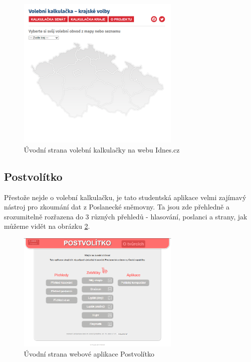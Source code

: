 \begin{figure}
    \centering
    \includegraphics[width=0.7\textwidth]{obrazky-figures/idnes-uvod.png}
    \caption{Úvodní strana volební kalkulačky na webu Idnes.cz}
    \label{fig:idnes-uvod}
\end{figure}

\subsection{Postvolítko}
Přestože nejde o volební kalkulačku, je tato studentská aplikace velmi zajímavý nástroj pro zkoumání dat z Poslanecké sněmovny. Ta jsou zde přehledně a srozumitelně rozřazena do 3 různých přehledů - hlasování, poslanci a strany, jak můžeme vidět na obrázku \ref{fig:postvolitko-uvod}.

\begin{figure}
    \centering
    \includegraphics[width=0.7\textwidth]{obrazky-figures/postvolitko-uvod.png}
    \caption{Úvodní strana webové aplikace Postvolítko}
    \label{fig:postvolitko-uvod}
\end{figure}


